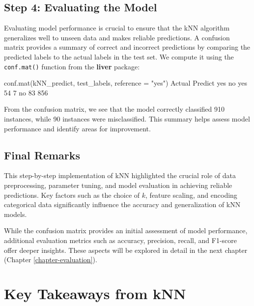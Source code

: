 \documentclass[
  11pt,
]{book}
\makeatletter
\newenvironment{Shaded}{}{}
\newcommand{\AttributeTok}[1]{#1}
\newcommand{\DecValTok}[1]{#1}
\newcommand{\FunctionTok}[1]{#1}
\newcommand{\NormalTok}[1]{#1}
\newcommand{\StringTok}[1]{\textcolor[rgb]{0.39,0.39,0.39}{#1}}
\newenvironment{kframe}{%
\medskip{}
\setlength{\fboxsep}{.8em}
 \def\at@end@of@kframe{}%
 \ifinner\ifhmode%
  \def\at@end@of@kframe{\end{minipage}}%
  \begin{minipage}{\columnwidth}%
 \fi\fi%
 \def\FrameCommand##1{\hskip\@totalleftmargin \hskip-\fboxsep
 \colorbox{shadecolor}{##1}\hskip-\fboxsep
     \hskip-\linewidth \hskip-\@totalleftmargin \hskip\columnwidth}%
 \MakeFramed {\advance\hsize-\width
   \@totalleftmargin\z@ \linewidth\hsize
   \@setminipage}}%
 {\par\unskip\endMakeFramed%
 \at@end@of@kframe}
\renewenvironment{Shaded}{\begin{kframe}}{\end{kframe}}
\theoremstyle{definition}
\theoremstyle{definition}
\theoremstyle{definition}
\theoremstyle{definition}
\theoremstyle{remark}
\makeatother
\begin{document}
\subsection{Step 4: Evaluating the Model}\label{step-4-evaluating-the-model}

Evaluating model performance is crucial to ensure that the kNN algorithm generalizes well to unseen data and makes reliable predictions. A confusion matrix provides a summary of correct and incorrect predictions by comparing the predicted labels to the actual labels in the test set. We compute it using the \texttt{conf.mat()} function from the \textbf{liver} package:

\begin{Shaded}
\begin{Highlighting}[]
\FunctionTok{conf.mat}\NormalTok{(kNN\_predict, test\_labels, }\AttributeTok{reference =} \StringTok{"yes"}\NormalTok{)}
\NormalTok{          Actual}
\NormalTok{   Predict yes  no}
\NormalTok{       yes  }\DecValTok{54}   \DecValTok{7}
\NormalTok{       no   }\DecValTok{83} \DecValTok{856}
\end{Highlighting}
\end{Shaded}

From the confusion matrix, we see that the model correctly classified 910 instances, while 90 instances were misclassified. This summary helps assess model performance and identify areas for improvement.

\subsection*{Final Remarks}\label{final-remarks}


This step-by-step implementation of kNN highlighted the crucial role of data preprocessing, parameter tuning, and model evaluation in achieving reliable predictions. Key factors such as the choice of \(k\), feature scaling, and encoding categorical data significantly influence the accuracy and generalization of kNN models.

While the confusion matrix provides an initial assessment of model performance, additional evaluation metrics such as accuracy, precision, recall, and F1-score offer deeper insights. These aspects will be explored in detail in the next chapter (Chapter \ref{chapter-evaluation}).

\section{Key Takeaways from kNN}\label{key-takeaways-from-knn}
\end{document}
